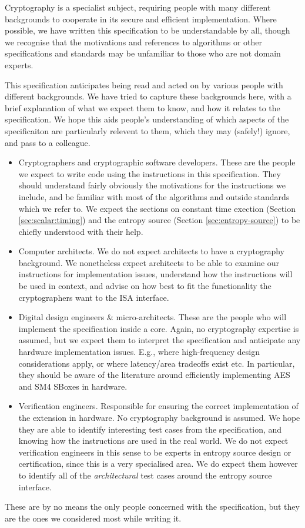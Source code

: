 
Cryptography is a specialist subject, requiring people with many different
backgrounds to cooperate in its secure and efficient implementation.
Where possible, we have written this specification to be understandable by
all, though we recognise that the motivations and references to
algorithms or other specifications and standards may be unfamiliar to those
who are not domain experts.

This specification anticipates being read and acted on by various people
with different backgrounds.
We have tried to capture these backgrounds
here, with a brief explanation of what we expect them to know, and how
it relates to the specification.
We hope this aids people's understanding of which aspects of the specificaiton
are particularly relevent to them, which they may (safely!) ignore, and
pass to a colleague.

\begin{itemize}
\item Cryptographers and cryptographic software developers.
  These are the people we expect to write code using the instructions
  in this specification.
  They should understand fairly obviously the motivations for the
  instructions we include, and be familiar with most of the algorithms
  and outside standards which we refer to.
  We expect the sections on constant time exection
  (Section \ref{sec:scalar:timing})
  and the entropy source (Section \ref{sec:entropy-source})
  to be chiefly understood with their help.
\item Computer architects.
  We do not expect architects to have a cryptography background.
  We nonetheless expect architects to be able to examine our instructions
  for implementation issues, understand how the instructions will be used
  in context, and advise on how best to fit the functionality the
  cryptographers want to the ISA interface.
\item Digital design engineers \& micro-architects.
  These are the people who will implement the specification inside a
  core. Again, no cryptography expertise is assumed, but we expect them to
  interpret the specification and anticipate any hardware implementation
  issues. E.g., where high-frequency design considerations apply, or where
  latency/area tradeoffs exist etc.
  In particular, they should be aware of the literature around efficiently
  implementing AES and SM4 SBoxes in hardware.
\item Verification engineers.
  Responsible for ensuring the correct implementation of the extension
  in hardware.
  No cryptography background is assumed.
  We hope they are able to identify interesting test cases from the
  specification, and knowing how the instructions are used in the real world.
  We do not expect verification engineers in this sense to be experts
  in entropy source design or certification, since this is a very
  specialised area.
  We do expect them however to identify all of the {\em architectural}
  test cases around the entropy source interface.
\end{itemize}

These are by no means the only people concerned with the specification,
but they are the ones we considered most while writing it.

